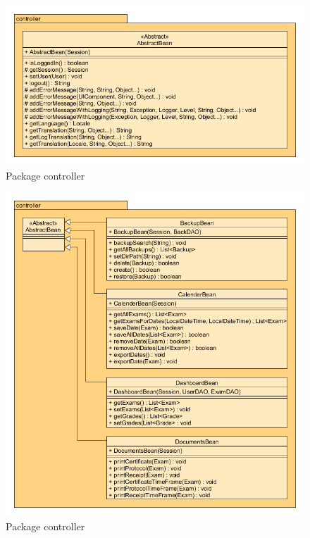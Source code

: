 \begin{figure}[H] 
\includegraphics[width=\textwidth]{../UMLDiagramme/controller/gfx/4_package_controller_part_0.png}
	\caption{Package controller}
	\label{s}
\end{figure}

\begin{figure}[H] \label{cal}
\includegraphics[width=\textwidth]{../UMLDiagramme/controller/gfx/4_package_controller_part_1.png}
	\caption{Package controller}
\end{figure}

